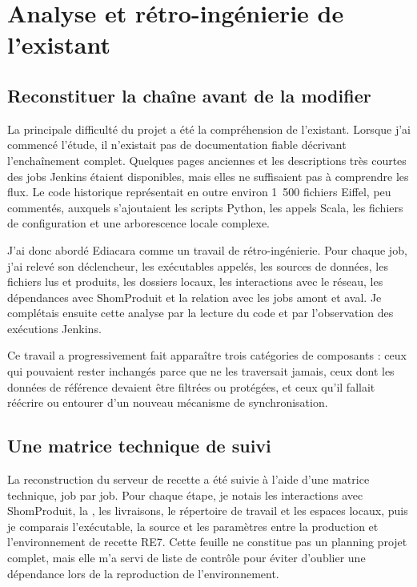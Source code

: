 \section{Analyse et rétro-ingénierie de l'existant}

\subsection{Reconstituer la chaîne avant de la modifier}

La principale difficulté du projet a été la compréhension de l'existant. Lorsque j'ai commencé l'étude, il n'existait pas de documentation fiable décrivant l'enchaînement complet. Quelques pages anciennes et les descriptions très courtes des jobs Jenkins étaient disponibles, mais elles ne suffisaient pas à comprendre les flux. Le code historique représentait en outre environ 1~500 fichiers Eiffel, peu commentés, auxquels s'ajoutaient les scripts Python, les appels Scala, les fichiers de configuration et une arborescence locale complexe.

J'ai donc abordé Ediacara comme un travail de rétro-ingénierie. Pour chaque job, j'ai relevé son déclencheur, les exécutables appelés, les sources de données, les fichiers lus et produits, les dossiers locaux, les interactions avec le réseau, les dépendances avec ShomProduit et la relation avec les jobs amont et aval. Je complétais ensuite cette analyse par la lecture du code et par l'observation des exécutions Jenkins.

Ce travail a progressivement fait apparaître trois catégories de composants : ceux qui pouvaient rester inchangés parce que  ne les traversait jamais, ceux dont les données de référence devaient être filtrées ou protégées, et ceux qu'il fallait réécrire ou entourer d'un nouveau mécanisme de synchronisation.

\subsection{Une matrice technique de suivi}

La reconstruction du serveur de recette a été suivie à l'aide d'une matrice technique, job par job. Pour chaque étape, je notais les interactions avec ShomProduit, la , les livraisons, le répertoire de travail et les espaces locaux, puis je comparais l'exécutable, la source et les paramètres entre la production et l'environnement de recette RE7. Cette feuille ne constitue pas un planning projet complet, mais elle m'a servi de liste de contrôle pour éviter d'oublier une dépendance lors de la reproduction de l'environnement.

